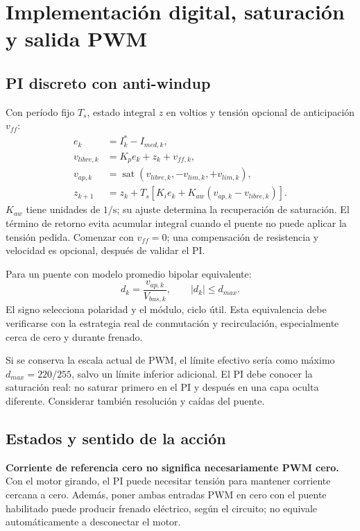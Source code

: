 \documentclass[11pt,a4paper]{article}
\newcommand{\sat}{\operatorname{sat}}
\begin{document}
\section{Implementación digital, saturación y salida PWM}
\subsection{PI discreto con anti-windup}
Con período fijo $T_s$, estado integral $z$ en voltios y tensión opcional de anticipación $v_{ff}$:
\begin{align}
e_k&=I_k^*-I_{med,k},\\
v_{libre,k}&=K_pe_k+z_k+v_{ff,k},\\
v_{ap,k}&=\sat(v_{libre,k},-v_{lim,k},+v_{lim,k}),\\
z_{k+1}&=z_k+T_s\left[K_ie_k+K_{aw}(v_{ap,k}-v_{libre,k})\right].
\end{align}
$K_{aw}$ tiene unidades de $1/\mathrm{s}$; su ajuste determina la recuperación de saturación. El término de retorno evita acumular integral cuando el puente no puede aplicar la tensión pedida. Comenzar con $v_{ff}=0$; una compensación de resistencia y velocidad es opcional, después de validar el PI.

Para un puente con modelo promedio bipolar equivalente:
\begin{equation}
d_k=\frac{v_{ap,k}}{V_{bus,k}},\qquad
|d_k|\leq d_{max}.
\end{equation}
El signo selecciona polaridad y el módulo, ciclo útil. Esta equivalencia debe verificarse con la estrategia real de conmutación y recirculación, especialmente cerca de cero y durante frenado.

Si se conserva la escala actual de PWM, el límite efectivo sería como máximo $d_{max}=220/255$, salvo un límite inferior adicional. El PI debe conocer la saturación real: no saturar primero en el PI y después en una capa oculta diferente. Considerar también resolución y caídas del puente.

\subsection{Estados y sentido de la acción}
\textbf{Corriente de referencia cero no significa necesariamente PWM cero.} Con el motor girando, el PI puede necesitar tensión para mantener corriente cercana a cero. Además, poner ambas entradas PWM en cero con el puente habilitado puede producir frenado eléctrico, según el circuito; no equivale automáticamente a desconectar el motor.
\end{document}
